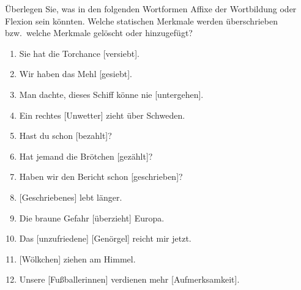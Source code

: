 \Uebung[\twostar]{} \label{exc:morphologie03} Überlegen Sie, was in den folgenden Wortformen Affixe der Wortbildung oder Flexion sein könnten.
Welche statischen Merkmale werden überschrieben bzw.\ welche Merkmale gelöscht oder hinzugefügt?

\begin{enumerate}
  \item Sie hat die Torchance {[versiebt]}.
  \item Wir haben das Mehl {[gesiebt]}.
  \item Man dachte, dieses Schiff könne nie {[untergehen]}.
  \item Ein rechtes {[Unwetter]} zieht über Schweden.
  \item Hast du schon {[bezahlt]}?
  \item Hat jemand die Brötchen {[gezählt]}?
  \item Haben wir den Bericht schon {[geschrieben]}?
  \item {[Geschriebenes]} lebt länger.
  \item Die braune Gefahr {[überzieht]} Europa.
  \item Das {[unzufriedene]} {[Genörgel]} reicht mir jetzt.
  \item {[Wölkchen]} ziehen am Himmel.
  \item Unsere {[Fußballerinnen]} verdienen mehr {[Aufmerksamkeit]}.
\end{enumerate}

